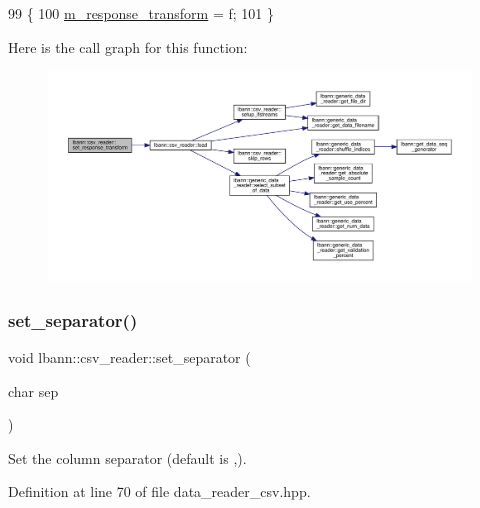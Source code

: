 \begin{DoxyCode}
99                                                                          \{
100     \hyperlink{classlbann_1_1csv__reader_a161c3606668efbc8910cad2f7fa01ed3}{m\_response\_transform} = f;
101   \}
\end{DoxyCode}
Here is the call graph for this function\+:\nopagebreak
\begin{figure}[H]
\begin{center}
\leavevmode
\includegraphics[width=350pt]{classlbann_1_1csv__reader_ac68eeea545dc8b2933339a51e55bd27e_cgraph}
\end{center}
\end{figure}
\mbox{\label{classlbann_1_1csv__reader_a58c71a6b3a82c064b349ae9d995bcffc}} 
\subsubsection{\texorpdfstring{set\+\_\+separator()}{set\_separator()}}
{\footnotesize\ttfamily void lbann\+::csv\+\_\+reader\+::set\+\_\+separator (\begin{DoxyParamCaption}\item[{char}]{sep }\end{DoxyParamCaption})\hspace{0.3cm}{\ttfamily [inline]}}



Set the column separator (default is \textquotesingle{},\textquotesingle{}). 



Definition at line 70 of file data\+\_\+reader\+\_\+csv.\+hpp.


